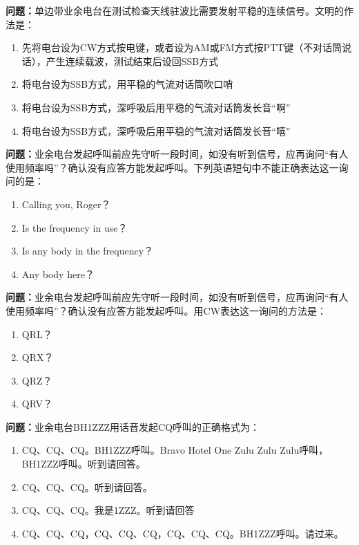 \bigskip


\noindent\textbf{问题：}单边带业余电台在测试检查天线驻波比需要发射平稳的连续信号。文明的作法是：
\begin{enumerate}[label=\Alph*), leftmargin=3em]
\item 先将电台设为CW方式按电键，或者设为AM或FM方式按PTT键（不对话筒说话），产生连续载波，测试结束后设回SSB方式
\item 将电台设为SSB方式，用平稳的气流对话筒吹口哨
\item 将电台设为SSB方式，深呼吸后用平稳的气流对话筒发长音“啊”
\item 将电台设为SSB方式，深呼吸后用平稳的气流对话筒发长音“嘻”
\end{enumerate}

\bigskip


\noindent\textbf{问题：}业余电台发起呼叫前应先守听一段时间，如没有听到信号，应再询问“有人使用频率吗”？确认没有应答方能发起呼叫。下列英语短句中不能正确表达这一询问的是：
\begin{enumerate}[label=\Alph*), leftmargin=3em]
\item Calling you, Roger？
\item Is the frequency in use？
\item Is any body in the frequency？
\item Any body here？
\end{enumerate}

\bigskip


\noindent\textbf{问题：}业余电台发起呼叫前应先守听一段时间，如没有听到信号，应再询问“有人使用频率吗”？确认没有应答方能发起呼叫。用CW表达这一询问的方法是：
\begin{enumerate}[label=\Alph*), leftmargin=3em]
\item QRL？
\item QRX？
\item QRZ？
\item QRV？
\end{enumerate}

\bigskip


\noindent\textbf{问题：}业余电台BH1ZZZ用话音发起CQ呼叫的正确格式为：
\begin{enumerate}[label=\Alph*), leftmargin=3em]
\item CQ、CQ、CQ。BH1ZZZ呼叫。Bravo Hotel One Zulu Zulu Zulu呼叫，BH1ZZZ呼叫。听到请回答。
\item CQ、CQ、CQ。听到请回答。
\item CQ、CQ、CQ。我是1ZZZ。听到请回答
\item CQ、CQ、CQ，CQ、CQ、CQ，CQ、CQ、CQ。BH1ZZZ呼叫。请过来。
\end{enumerate}


